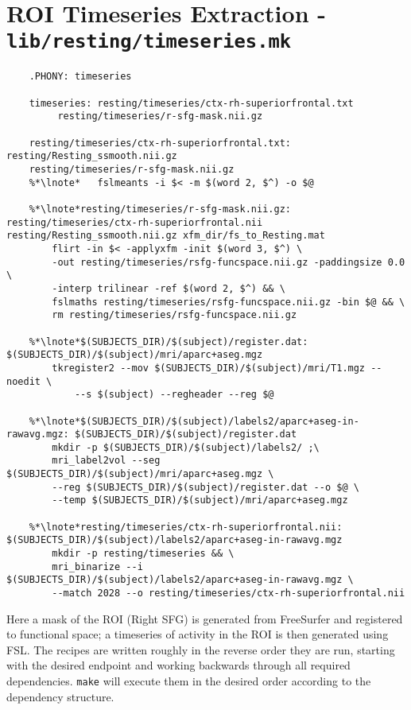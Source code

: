 \section{ROI Timeseries Extraction - \texttt{lib/resting/timeseries.mk}}
\begin{lstlisting}
	.PHONY: timeseries
	
	timeseries: resting/timeseries/ctx-rh-superiorfrontal.txt
		 resting/timeseries/r-sfg-mask.nii.gz
	
	resting/timeseries/ctx-rh-superiorfrontal.txt: resting/Resting_ssmooth.nii.gz 
	resting/timeseries/r-sfg-mask.nii.gz
	%*\lnote*	fslmeants -i $< -m $(word 2, $^) -o $@
	
	%*\lnote*resting/timeseries/r-sfg-mask.nii.gz: resting/timeseries/ctx-rh-superiorfrontal.nii resting/Resting_ssmooth.nii.gz xfm_dir/fs_to_Resting.mat
		flirt -in $< -applyxfm -init $(word 3, $^) \
		-out resting/timeseries/rsfg-funcspace.nii.gz -paddingsize 0.0 \
		-interp trilinear -ref $(word 2, $^) && \
		fslmaths resting/timeseries/rsfg-funcspace.nii.gz -bin $@ && \
		rm resting/timeseries/rsfg-funcspace.nii.gz
	
	%*\lnote*$(SUBJECTS_DIR)/$(subject)/register.dat: $(SUBJECTS_DIR)/$(subject)/mri/aparc+aseg.mgz
		tkregister2 --mov $(SUBJECTS_DIR)/$(subject)/mri/T1.mgz --noedit \
			--s $(subject) --regheader --reg $@
	
	%*\lnote*$(SUBJECTS_DIR)/$(subject)/labels2/aparc+aseg-in-rawavg.mgz: $(SUBJECTS_DIR)/$(subject)/register.dat
		mkdir -p $(SUBJECTS_DIR)/$(subject)/labels2/ ;\
		mri_label2vol --seg $(SUBJECTS_DIR)/$(subject)/mri/aparc+aseg.mgz \
		--reg $(SUBJECTS_DIR)/$(subject)/register.dat --o $@ \
		--temp $(SUBJECTS_DIR)/$(subject)/mri/aparc+aseg.mgz
	
	%*\lnote*resting/timeseries/ctx-rh-superiorfrontal.nii: $(SUBJECTS_DIR)/$(subject)/labels2/aparc+aseg-in-rawavg.mgz
		mkdir -p resting/timeseries && \
		mri_binarize --i $(SUBJECTS_DIR)/$(subject)/labels2/aparc+aseg-in-rawavg.mgz \
		--match 2028 --o resting/timeseries/ctx-rh-superiorfrontal.nii
\end{lstlisting}
Here a mask of the ROI (Right SFG) is generated from FreeSurfer and registered to functional space; a timeseries of activity in the ROI is then generated using FSL. The recipes are written roughly in the reverse order they are run, starting with the desired endpoint and working backwards through all required dependencies. \texttt{make} will execute them in the desired order according to the dependency structure.

